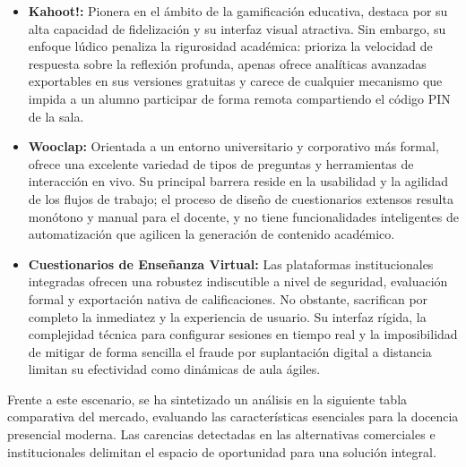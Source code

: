 \begin{itemize}
    \item \textbf{Kahoot!:} Pionera en el ámbito de la gamificación educativa, destaca por su alta capacidad de fidelización y su interfaz visual atractiva. Sin embargo, su enfoque lúdico penaliza la rigurosidad académica: prioriza la velocidad de respuesta sobre la reflexión profunda, apenas ofrece analíticas avanzadas exportables en sus versiones gratuitas y carece de cualquier mecanismo que impida a un alumno participar de forma remota compartiendo el código PIN de la sala.
    \item \textbf{Wooclap:} Orientada a un entorno universitario y corporativo más formal, ofrece una excelente variedad de tipos de preguntas y herramientas de interacción en vivo. Su principal barrera reside en la usabilidad y la agilidad de los flujos de trabajo; el proceso de diseño de cuestionarios extensos resulta monótono y manual para el docente, y no tiene funcionalidades inteligentes de automatización que agilicen la generación de contenido académico.
    \item \textbf{Cuestionarios de Enseñanza Virtual:} Las plataformas institucionales integradas ofrecen una robustez indiscutible a nivel de seguridad, evaluación formal y exportación nativa de calificaciones. No obstante, sacrifican por completo la inmediatez y la experiencia de usuario. Su interfaz rígida, la complejidad técnica para configurar sesiones en tiempo real y la imposibilidad de mitigar de forma sencilla el fraude por suplantación digital a distancia limitan su efectividad como dinámicas de aula ágiles.
\end{itemize}

Frente a este escenario, se ha sintetizado un análisis en la siguiente tabla comparativa del mercado, evaluando las características esenciales para la docencia presencial moderna. Las carencias detectadas en las alternativas comerciales e institucionales delimitan el espacio de oportunidad para una solución integral.


